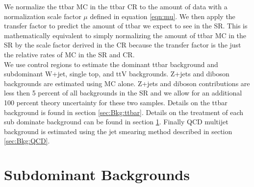 \indent We normalize the ttbar MC in the ttbar CR to the amount of data with a normalization scale factor $\mu$ defined in equation \ref{eqn:mu}.  We then apply the transfer factor to predict the amount of ttbar we expect to see in the SR.  This is mathematically equivalent to simply normalizing the amount of ttbar MC in the SR by the scale factor derived in the CR because the transfer factor is the just the relative rates of MC in the SR and CR.   \\
\indent We use control regions to estimate the dominant ttbar background and subdominant W+jet, single top, and ttV backgrounds.  Z+jets and diboson backgrounds are estimated using MC alone.  Z+jets and diboson contributions are less then 5 percent of all backgrounds in the SR and we allow for an additional 100 percent theory uncertainty for these two samples.  Details on the ttbar background is found in section \ref{sec:Bkg:ttbar}. Details on the treatment of each sub dominate background can be found in section \ref{sec:Bkg:sub}. Finally QCD multijet background is estimated using the jet smearing method described in section \ref{sec:Bkg:QCD}.



\section{Subdominant Backgrounds}
\label{sec:Bkg:sub}






